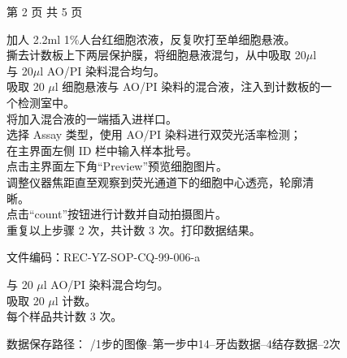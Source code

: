 \documentclass[UTF8,10pt,a4paper,fontset=fandol]{ctexart}
\newcommand{\fieldvalue}[1]{#1}
\newcommand{\handwritten}[1]{#1}
\begin{document}
\begin{center}
第 2 页 共 5 页
\end{center}

\newpage

\noindent
加人 2.2ml 1\%人台红细胞浓液，反复吹打至单细胞悬液。\\
撕去计数板上下两层保护膜，将细胞悬液混匀，从中吸取 20$\mu$l\\
与 20$\mu$l AO/PI 染料混合均匀。\\
吸取
\handwritten{20}
$\mu$l 细胞悬液与 AO/PI 染料的混合液，注入到计数板的一\\
个检测室中。\\
将加入混合液的一端插入进样口。\\
选择 Assay 类型，使用 AO/PI 染料进行双荧光活率检测；\\
在主界面左侧 ID 栏中输入样本批号。\\
点击主界面左下角“Preview”预览细胞图片。\\
调整仪器焦距直至观察到荧光通道下的细胞中心透亮，轮廓清\\
晰。\\
点击“count”按钮进行计数并自动拍摄图片。\\
重复以上步骤 2 次，共计数 3 次。打印数据结果。

\medskip
\noindent
文件编码：REC-YZ-SOP-CQ-99-006-a

\medskip
\noindent
与
\handwritten{20}
$\mu$l AO/PI 染料混合均匀。\\
吸取
\handwritten{20}
$\mu$l 计数。\\
每个样品共计数
\handwritten{3}
次。

\medskip
\noindent
数据保存路径：
\fieldvalue{\handwritten{/1步的图像--第一步中14--牙齿数据--4结存数据--2次}}
\end{document}
